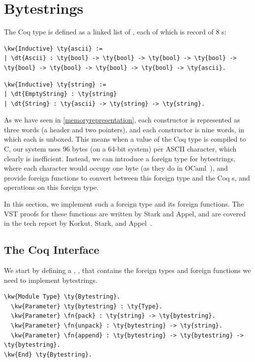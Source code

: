 \section{Bytestrings}
\label{bytestrings}

The Coq  type
is defined as a linked list of , each of which is record of 8 s:
\begin{Verbatim}
\kw{Inductive} \ty{ascii} := 
| \dt{Ascii} : \ty{bool} -> \ty{bool} -> \ty{bool} -> \ty{bool} -> \ty{bool} -> \ty{bool} -> \ty{bool} -> \ty{bool} -> \ty{ascii}.
\end{Verbatim}

\begin{Verbatim}
\kw{Inductive} \ty{string} := 
| \dt{EmptyString} : \ty{string} 
| \dt{String} : \ty{ascii} -> \ty{string} -> \ty{string}.
\end{Verbatim}

As we have seen in \autoref{memoryrepresentation}, each  constructor is represented as
three words (a header and two pointers), and
each  constructor is nine words,
in which each  is \gls{unboxed}. This means when a value of the Coq type  is compiled to C, our system uses 96 bytes (on a 64-bit system) per ASCII character, which clearly is inefficient.
Instead, we can introduce a \gls{foreign type} for bytestrings, where each character would occupy one byte (as they do in OCaml~\cite[Chapter 23, ``string values'']{madhavapeddy2022real}), and provide \gls{foreign function}s to convert between this \gls{foreign type} and the Coq s, and operations on this \gls{foreign type}.

In this section, we implement such a \gls{foreign type} and its \gls{foreign function}s. The VST proofs for these functions are written by Stark and Appel, and are covered in the tech report by Korkut, Stark, and Appel~\cite{korkutStarkAppel}.

\subsection{The Coq Interface}

We start by defining a , , that contains the \gls{foreign type}s and \gls{foreign function}s we need to implement bytestrings.

\begin{Verbatim}
\kw{Module Type} \ty{Bytestring}.
  \kw{Parameter} \ty{bytestring} : \ty{Type}.
  \kw{Parameter} \fn{pack} : \ty{string} -> \ty{bytestring}.
  \kw{Parameter} \fn{unpack} : \ty{bytestring} -> \ty{string}.
  \kw{Parameter} \fn{append} : \ty{bytestring} -> \ty{bytestring} -> \ty{bytestring}.
\kw{End} \ty{Bytestring}.
\end{Verbatim}

